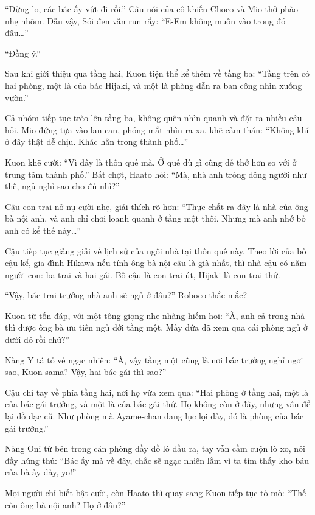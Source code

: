 \documentclass[../main.tex]{subfiles}
\begin{document}
``Đừng lo, các bác ấy vứt đi rồi.'' Câu nói của cô khiến Choco và Mio thở phào nhẹ nhõm. Dẫu vậy, Sói đen vẫn run rẩy: ``E-Em không muốn vào trong đó đâu\dots''

``Đồng ý.''

\ct

Sau khi giới thiệu qua tầng hai, Kuon tiện thể kể thêm về tầng ba: ``Tầng trên có hai phòng, một là của bác Hijaki, và một là phòng dẫn ra ban công nhìn xuống vườn.''

Cả nhóm tiếp tục trèo lên tầng ba, không quên nhìn quanh và đặt ra nhiều câu hỏi. Mio đứng tựa vào lan can, phóng mắt nhìn ra xa, khẽ cảm thán: ``Không khí ở đây thật dễ chịu. Khác hẳn trong thành phố\dots''

Kuon khẽ cười: ``Vì đây là thôn quê mà. Ở quê dù gì cũng dễ thở hơn so với ở trung tâm thành phố.'' Bất chợt, Haato hỏi: ``Mà, nhà anh trông đông người như thế, ngủ nghỉ sao cho đủ nhỉ?''

Cậu con trai nở nụ cười nhẹ, giải thích rõ hơn: ``Thực chất ra đây là nhà của ông bà nội anh, và anh chỉ chơi loanh quanh ở tầng một thôi. Nhưng mà anh nhớ bố anh có kể thế này\dots''

Cậu tiếp tục giảng giải về lịch sử của ngôi nhà tại thôn quê này. Theo lời của bố cậu kể, gia đình Hikawa nếu tính ông bà nội cậu là già nhất, thì nhà cậu có năm người con: ba trai và hai gái. Bố cậu là con trai út, Hijaki là con trai thứ.

``Vậy, bác trai trưởng nhà anh sẽ ngủ ở đâu?'' Roboco thắc mắc?

Kuon từ tốn đáp, với một tông giọng nhẹ nhàng hiếm hoi: ``À, anh cả trong nhà thì được ông bà ưu tiên ngủ dới tầng một. Mấy đứa đã xem qua cái phòng ngủ ở dưới đó rồi chứ?''

Nàng Y tá tỏ vẻ ngạc nhiên: ``À, vậy tầng một cũng là nơi bác trưởng nghỉ ngơi sao, Kuon-sama? Vậy, hai bác gái thì sao?''

Cậu chỉ tay về phía tầng hai, nơi họ vừa xem qua: ``Hai phòng ở tầng hai, một là của bác gái trưởng, và một là của bác gái thứ. Họ không còn ở đây, nhưng vẫn để lại đồ đạc cũ. Như phòng mà Ayame-chan đang lục lọi đấy, đó là phòng của bác gái trưởng.''

Nàng Oni từ bên trong căn phòng đầy đồ ló đầu ra, tay vẫn cầm cuộn lò xo, nói đầy hứng thú: ``Bác ấy mà về đây, chắc sẽ ngạc nhiên lắm vì ta tìm thấy kho báu của bà ấy đấy, yo!''

Mọi người chỉ biết bật cười, còn Haato thì quay sang Kuon tiếp tục tò mò: ``Thế còn ông bà nội anh? Họ ở đâu?''
\end{document}
